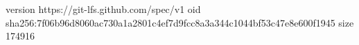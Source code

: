 version https://git-lfs.github.com/spec/v1
oid sha256:7f06b96d8060ac730a1a2801c4ef7d9fcc8a3a344c1044bf53c47e8e600f1945
size 174916
